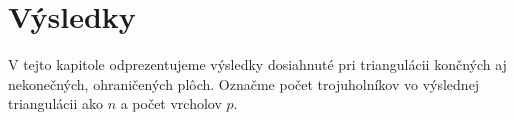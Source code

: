 \newcommand{\ApplyGradientH}[1]{%
  \iftoggle{inTableHeader}{#1}{
    \ifdim #1 pt > \MidNumberH pt
        \pgfmathsetmacro{\PercentColor}{max(min(100.0*(#1 - \MidNumberH)/(\MaxNumberH-\MidNumberH),100.0),0.00)} %
        \colorbox{green!\PercentColor!yellow}{#1}
    \else
        \pgfmathsetmacro{\PercentColor}{max(min(100.0*(\MidNumberH - #1)/(\MidNumberH-\MinNumberH),100.0),0.00)} %
        \colorbox{red!\PercentColor!yellow}{#1}
    \fi
  }
  }




\renewcommand{\arraystretch}{1}
\setlength{\fboxsep}{2mm} %
\setlength{\tabcolsep}{-4pt}

\chapter{Výsledky}
\label{kap:results}

V tejto kapitole odprezentujeme výsledky dosiahnuté pri triangulácii končných aj 
nekonečných, ohraničených plôch. Označme počet trojuholníkov vo výslednej triangulácii 
ako $n$ a počet vrcholov $p$.

